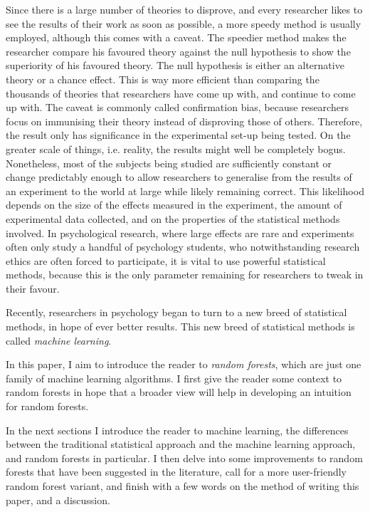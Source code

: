 \documentclass[a4paper,man,12pt,apacite,floatsintext]{apa6} %
\begin{document}
Since there is a large number of theories to disprove, and every
researcher likes to see the results of their work as soon as possible, a
more speedy method is usually employed, although this comes with a caveat.
The speedier method makes the researcher compare his favoured theory against
the null hypothesis to show the superiority of his favoured theory.
The null hypothesis is either an alternative theory or a chance effect.
This is way more efficient than comparing the thousands of
theories that researchers have come up with, and continue to come up with.
The caveat is commonly called confirmation bias, because researchers focus
on immunising their theory instead of disproving those of others.
Therefore, the result only has significance in the experimental set-up
being tested.
On the greater scale of things, i.e. reality, the results might well be
completely bogus.
Nonetheless, most of the subjects being studied are sufficiently constant
or change predictably enough to allow researchers to generalise from the
results of an experiment to the world at large while likely remaining correct.
This likelihood depends on the size of the effects measured in the
experiment, the amount of experimental data collected,
and on the properties of the statistical methods involved.
In psychological research, where large effects are rare and
experiments often only study a handful of psychology students, who
notwithstanding research ethics are often forced to participate, it is
vital to use powerful statistical methods, because this is the only parameter
remaining for researchers to tweak in their favour.

Recently, researchers in psychology began to turn to a new breed of
statistical methods, in hope of ever better results. This new breed of
statistical methods is called \emph{machine learning}.

In this paper, I aim to introduce the reader to \emph{random forests},
which are just one family of machine learning algorithms.
I first give the reader some context to random forests in hope that a
broader view will help in developing an intuition for random forests.

In the next sections I introduce the reader to machine learning,
the differences between the traditional statistical approach and the
machine learning approach, and random forests in particular.
I then delve into some improvements to random forests that have been
suggested in the literature, call for a more user-friendly random forest variant, and finish
with a few words on the method of writing this paper, and a discussion.
\end{document}
